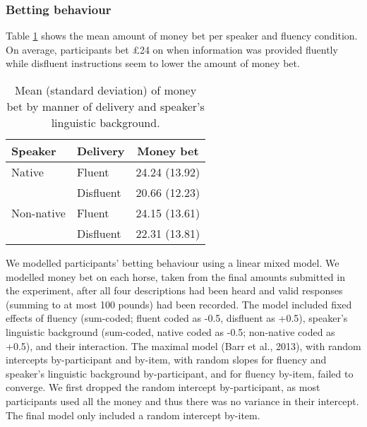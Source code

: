 \documentclass[
  man,floatsintext]{apa7}
\begin{document}
\hypertarget{betting-behaviour}{%
\subsubsection{Betting behaviour}\label{betting-behaviour}}

Table \ref{tab:tab-dist-money} shows the mean amount of money bet per speaker and fluency condition. On average, participants bet £24 on when information was provided fluently while disfluent instructions seem to lower the amount of money bet.

\begin{table}[tbp]

\begin{center}
\begin{threeparttable}

\caption{\label{tab:tab-dist-money}Mean (standard deviation) of money bet by manner of delivery and speaker’s linguistic
background.}

\begin{tabular}{lll}
\toprule
Speaker & \multicolumn{1}{c}{Delivery} & \multicolumn{1}{c}{Money bet}\\
\midrule
Native & Fluent & 24.24 (13.92)\\
 & Disfluent & 20.66 (12.23)\\
Non-native & Fluent & 24.15 (13.61)\\
 & Disfluent & 22.31 (13.81)\\
\bottomrule
\end{tabular}

\end{threeparttable}
\end{center}

\end{table}

We modelled participants' betting behaviour using a linear mixed model. We modelled money bet on each horse, taken from the final amounts submitted in the experiment, after all four descriptions had been heard and valid responses (summing to at most 100 pounds) had been recorded. The model included fixed effects of fluency (sum-coded; fluent coded as -0.5, disfluent as +0.5), speaker's linguistic background (sum-coded, native coded as -0.5; non-native coded as +0.5), and their interaction. The maximal model (Barr et al., 2013), with random intercepts by-participant and by-item, with random slopes for fluency and speaker's linguistic background by-participant, and for fluency by-item, failed to converge. We first dropped the random intercept by-participant, as most participants used all the money and thus there was no variance in their intercept. The final model only included a random intercept by-item.
\end{document}
